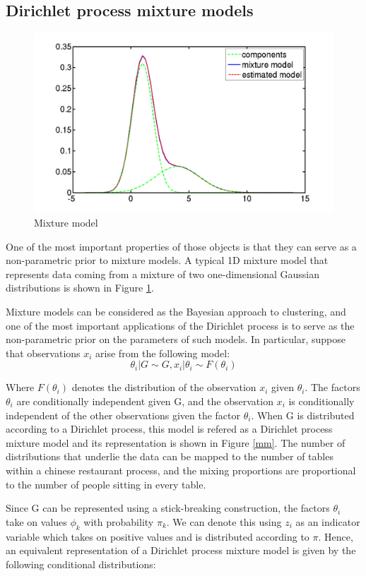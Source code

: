\documentclass [twoside,hidelinks]{article}
\begin{document}
\subsection{Dirichlet process mixture models}

\begin{figure} [!ht]
    \centerline{\includegraphics [width=.45\textwidth]{1DGMM}}
	\caption{Mixture model}
	\label{1dGMM}
\end{figure}

One of the most important properties of those objects is that they can serve as a non-parametric prior to mixture models. A typical 1D mixture model that represents data coming from a mixture of two one-dimensional Gaussian distributions is shown in Figure \ref{1dGMM}.

Mixture models can be considered as the Bayesian approach to clustering, and one of the most important applications of the Dirichlet process is to serve as the non-parametric prior on the parameters of such models. In particular, suppose that observations $x_i$ arise from the following model:
	\begin{equation}
			\theta_i | G \sim G ,
			x_i | \theta_i \sim F (\theta_i )
	\end{equation}

Where $F (\theta_i )$ denotes the distribution of the observation $x_i$ given $\theta_i $. The factors $ \theta_i $ are conditionally independent given G, and the observation $x_i$ is conditionally independent of the other observations given the factor $\theta_i$. When G is distributed according to a Dirichlet process, this model is refered as a Dirichlet process mixture model and its representation is shown in Figure \ref{mm}. The number of distributions that underlie the data can be mapped to the number of tables within a chinese restaurant process, and the mixing proportions are proportional to the number of people sitting in every table.

Since G can be represented using a stick-breaking construction, the factors $ \theta_i $ take on values $\phi_k$ with probability $\pi_k$. We can denote this using $z_i$ as an indicator variable which takes on positive values and is distributed according to \textbf{$\pi$}. Hence, an equivalent representation of a Dirichlet process mixture model  is given by the following conditional distributions:
\end{document}
